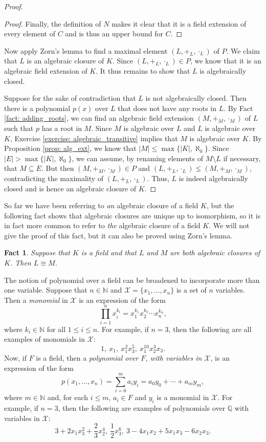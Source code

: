 \documentclass[a4paper]{memoir}
\newtheorem{fact}[theorem]{Fact}
\theoremstyle{definition}
\newcommand{\bb}{\mathbb}
\newcommand{\mc}{\mathcal}
\begin{document}
\begin{proof}
\begin{proof}
    Finally, the definition of $N$ makes it clear that it is a field extension of every element 
    of $C$ and is thus an upper bound for $C$.
  \end{proof}
  
  Now apply Zorn's lemma to find a maximal element $(L, +_L, \cdot_L)$ of $P$. We claim that 
  $L$ is an algebraic closure of $K$. Since $(L, +_L, \cdot_L) \in P$, we know that it is 
  an algebraic field extension of $K$. It thus remains to show that $L$ is algebraically closed.
  
  Suppose for the sake of contradiction that $L$ is not algebraically closed. Then there is 
  a polynomial $p(x)$ over $L$ that does not have any roots in $L$. By Fact \ref{fact: adding_roots}, 
  we can find an algebraic field extension $(M, +_M, \cdot_M)$ of $L$ such that $p$ has a root 
  in $M$. Since $M$ is algebraic over $L$ and $L$ is algebraic over $K$, Exercise 
  \ref{exercise: algebraic_transitive} implies that $M$ is algebraic over $K$. By 
  Proposition \ref{prop: alg_ext}, we know that $|M| \leq \max\{|K|, \aleph_0\}$. 
  Since $|E| > \max\{|K|, \aleph_0\}$, we can assume, by renaming elements of 
  $M \setminus L$ if necessary, that $M \subseteq E$. But then $(M, +_M, \cdot_M) \in P$ 
  and $(L, +_L, \cdot_L) \lneq (M, +_M, \cdot_M)$, contradicting the maximality of 
  $(L, +_L, \cdot_L)$. Thus, $L$ is indeed algebraically closed and is hence an algebraic 
  closure of $K$.
\end{proof}

So far we have been referring to \emph{an} algebraic closure of a field $K$, but the following 
fact shows that algebraic closures are unique up to isomorphism, so it is in fact more common 
to refer to \emph{the} algebraic closure of a field $K$. We will not give the proof of this 
fact, but it can also be proved using Zorn's lemma.

\begin{fact} \label{fact: alg_closure}
  Suppose that $K$ is a field and that $L$ and $M$ are both algebraic closures of $K$. 
  Then $L \cong M$.
\end{fact}

The notion of polynomial over a field can be broadened to incorporate more than one variable.
Suppose that $n \in \bb{N}$ and $\mc{X} = \{x_1, \ldots, x_n\}$ is a set of $n$ variables. 
Then a \emph{monomial} in $\mc{X}$ is an expression of the form 
\[
  \prod_{i=1}^n x_i^{k_i} = x_1^{k_1} x_2^{k_2} \cdots x_n^{k_n},
\]
where $k_i \in \bb{N}$ for all $1 \leq i \leq n$. For example, if $n = 3$, then the following are 
all examples of monomials in $\mc{X}$:
\[
  1, \  x_1, \  x_1^2x_3^5, \  x_1^{10}x_2^3x_3.
\]
Now, if $F$ is a field, then a \emph{polynomial over $F$, with variables in $\mc{X}$}, 
is an expression of the form 
\[
  p(x_1, \ldots, x_n) = \sum_{i = 0}^m a_i y_i = a_0y_0 + \cdots + a_my_m,
\]
where $m \in \bb{N}$ and, for each $i \leq m$, $a_i \in F$ and $y_i$ is a monomial in $\mc{X}$. 
For example, if $n = 3$, then the following are examples of polynomials over $\bb{Q}$ with 
variables in $\mc{X}$:
\[
  3 + 2x_1x_3^2 + \frac{2}{3}x_2^4, \ \frac{1}{2}x_3^6, \ 3 - 4x_1x_2 + 5x_1x_3 -6 x_2x_3.
\]
\end{document}
